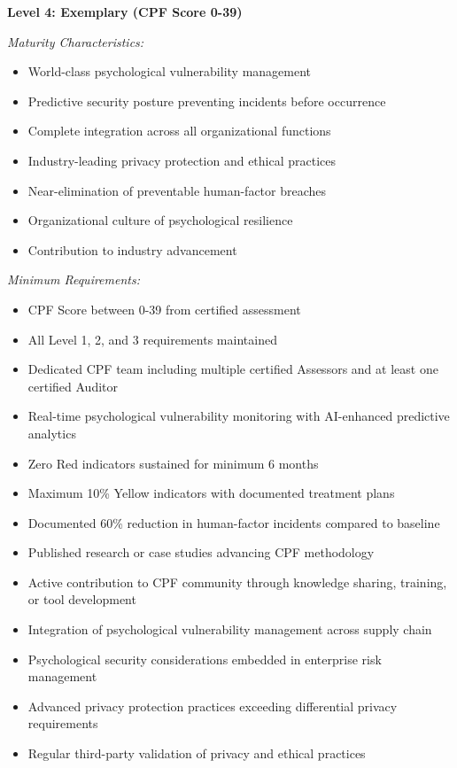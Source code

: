 \documentclass[11pt,a4paper]{article}
\begin{document}
\textbf{Level 4: Exemplary (CPF Score 0-39)}

\textit{Maturity Characteristics:}
\begin{itemize}
\item World-class psychological vulnerability management
\item Predictive security posture preventing incidents before occurrence
\item Complete integration across all organizational functions
\item Industry-leading privacy protection and ethical practices
\item Near-elimination of preventable human-factor breaches
\item Organizational culture of psychological resilience
\item Contribution to industry advancement
\end{itemize}

\textit{Minimum Requirements:}
\begin{itemize}
\item CPF Score between 0-39 from certified assessment
\item All Level 1, 2, and 3 requirements maintained
\item Dedicated CPF team including multiple certified Assessors and at least one certified Auditor
\item Real-time psychological vulnerability monitoring with AI-enhanced predictive analytics
\item Zero Red indicators sustained for minimum 6 months
\item Maximum 10\% Yellow indicators with documented treatment plans
\item Documented 60\% reduction in human-factor incidents compared to baseline
\item Published research or case studies advancing CPF methodology
\item Active contribution to CPF community through knowledge sharing, training, or tool development
\item Integration of psychological vulnerability management across supply chain
\item Psychological security considerations embedded in enterprise risk management
\item Advanced privacy protection practices exceeding differential privacy requirements
\item Regular third-party validation of privacy and ethical practices
\end{itemize}
\end{document}
